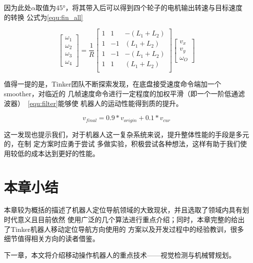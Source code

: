 因为此处$\alpha$取值为\ang{45}，将其带入后可以得到四个轮子的电机输出转速与目标速度的转换
公式为\ref{equ:fin_all}

\begin{equation}
  \label{equ:fin_all}
  \begin{bmatrix}
    \omega_1 \\
    \omega_2 \\
    \omega_3 \\
    \omega_4
  \end{bmatrix}
    = \frac{1}{R}
  \begin{bmatrix}
    1 &  1 & -(L_1 + L_2) \\
    1 & -1 &  (L_1 + L_2) \\
    1 & -1 & -(L_1 + L_2) \\
    1 &  1 &  (L_1 + L_2) \\
  \end{bmatrix}
  \begin{bmatrix}
    v_x \\
    v_y \\
    \omega_O
  \end{bmatrix}
\end{equation}

值得一提的是，Tinker团队不断探索发现，在底盘接受速度命令端加一个smoother，对临近的
几帧速度命令进行一定程度的加权平滑（即一个一阶低通滤波器）~\ref{equ:filter}能够使
机器人的运动性能得到质的提升。

\begin{equation}
  \label{equ:filter}
  v_{final} = 0.9 * v_{origin} + 0.1 * v_{cur}
\end{equation}

这一发现也提示我们，对于机器人这一复杂系统来说，提升整体性能的手段是多元的，在制
定方案时应勇于尝试
多做实验，积极尝试各种想法，这样有助于我们使用较低的成本达到更好的性能。

\section{本章小结}

本章较为概括的描述了机器人定位导航领域的大致现状，并且选取了领域内具有划时代意义且目前依然
使用广泛的几个算法进行重点介绍；同时，本章完整的给出了Tinker机器人移动定位导航方向使用的
方案以及开发过程中的经验教训，很多细节值得相关方向的读者借鉴。

下一章，本文将介绍移动操作机器人的重点技术——视觉检测与机械臂规划。




